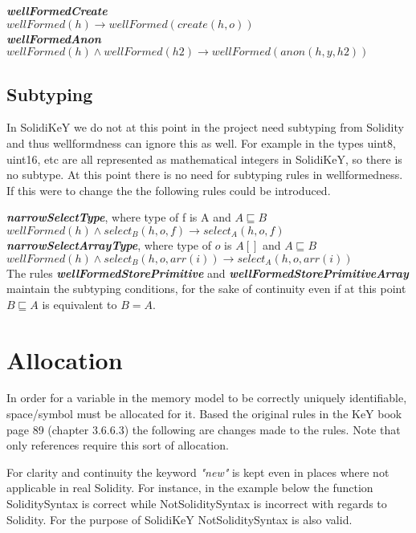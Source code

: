 \documentclass{article}
\begin{document}
	\textit{\textbf{wellFormedCreate}} \\
	$wellFormed(h) \to wellFormed(create(h,o))$\\
	
	\textit{\textbf{wellFormedAnon}} \\
	$wellFormed(h)\land wellFormed(h2) \to wellFormed(anon(h, y,h2))$\\
	
	\subsection{Subtyping}
	In SolidiKeY we do not at this point in the project need subtyping from Solidity and thus wellformdness can ignore this as well. For example in the types uint8, uint16, etc are all represented as mathematical integers in SolidiKeY, so there is no subtype. At this point there is no need for subtyping rules in wellformedness. If this were to change the the following rules could be introduced. 
	
	\textit{\textbf{narrowSelectType}},  where type of f is A and $A \sqsubseteq B$ \\
	$wellFormed(h) \land select_B(h,o, f) \to select_A(h,o, f)$\\
	
	\textit{\textbf{narrowSelectArrayType}},  where type of $o$ is $A[]$ and $A \sqsubseteq B$  \\
	$wellFormed(h) \land select_B(h,o,arr(i)) \to select_A(h,o,arr(i))$\\
	
	The rules \textit{\textbf{wellFormedStorePrimitive}} and \textit{\textbf{wellFormedStorePrimitiveArray}} maintain the subtyping conditions, for the sake of continuity even if at this point $B \sqsubseteq A$ is equivalent to $B = A$. 
	
	
	\section{Allocation} \label{alloc}
	In order for a variable in the memory model to be correctly uniquely identifiable, space/symbol must be allocated for it. Based the original rules in the KeY book page 89 (chapter 3.6.6.3) the following are changes made to the rules. Note that only references require this sort of allocation. 
	
	For clarity and continuity the keyword \textit{"new"} is kept even in places where not applicable in real Solidity. For instance, in the example below the function SoliditySyntax is correct while NotSoliditySyntax is incorrect with regards to Solidity. For the purpose of SolidiKeY NotSoliditySyntax is also valid. 
	
\end{document}

